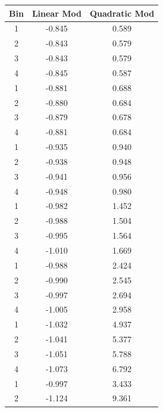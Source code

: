 \begin{tabular}{|c|c|c|}
\hline
\textbf{Bin} & \textbf{Linear Mod} & \textbf{Quadratic Mod} \\
\hline
1 & -0.845 & 0.589 \\
2 & -0.843 & 0.579 \\
3 & -0.843 & 0.579 \\
4 & -0.845 & 0.587 \\
\hline
1 & -0.881 & 0.688 \\
2 & -0.880 & 0.684 \\
3 & -0.879 & 0.678 \\
4 & -0.881 & 0.684 \\
\hline
1 & -0.935 & 0.940 \\
2 & -0.938 & 0.948 \\
3 & -0.941 & 0.956 \\
4 & -0.948 & 0.980 \\
\hline
1 & -0.982 & 1.452 \\
2 & -0.988 & 1.504 \\
3 & -0.995 & 1.564 \\
4 & -1.010 & 1.669 \\
\hline
1 & -0.988 & 2.424 \\
2 & -0.990 & 2.545 \\
3 & -0.997 & 2.694 \\
4 & -1.005 & 2.958 \\
\hline
1 & -1.032 & 4.937 \\
2 & -1.041 & 5.377 \\
3 & -1.051 & 5.788 \\
4 & -1.073 & 6.792 \\
\hline
1 & -0.997 & 3.433 \\
2 & -1.124 & 9.361 \\
\hline
\end{tabular}
